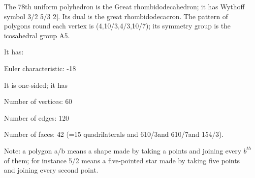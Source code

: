 The 78th uniform polyhedron is the Great rhombidodecahedron; it has Wythoff symbol 3/2 5/3 2|. Its dual is the great rhombidodecacron. The pattern of polygons round each vertex is (4,10/3,4/3,10/7); its symmetry group is the icosahedral group A5.\par
It has:\par
Euler characteristic: -18\par
It is one-sided; it has\par
Number of vertices: 60\par
Number of edges:  120\par
Number of faces: 42 (=15 quadrilaterals and 6{10/3}and 6{10/7}and 15{4/3}).\par
Note: a polygon a/b means a shape made by taking a points and joining every $b^{th}$  of them; for instance 5/2 means a five-pointed star made by taking five points and joining every second point.